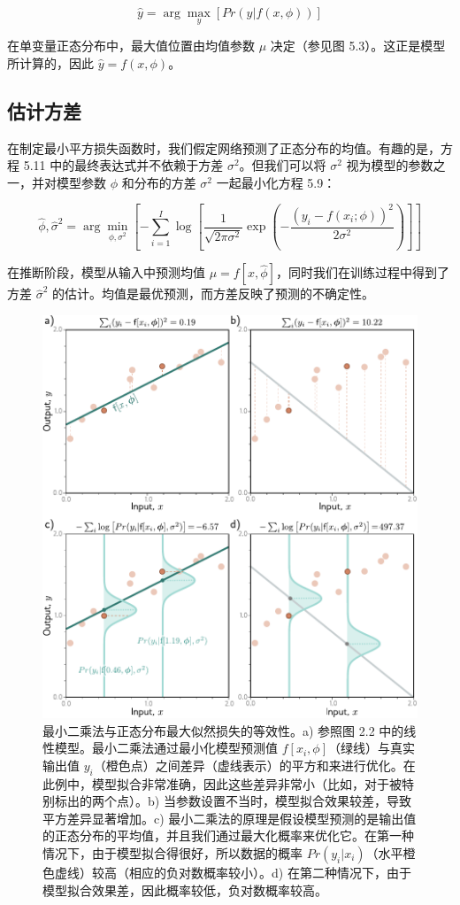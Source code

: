 \documentclass[lang=cn,newtx,10pt,scheme=chinese]{elegantbook}
\begin{document}
\begin{equation}
\hat{y} = \arg\max_y [Pr(y|f(x, \phi))] 
\end{equation}


在单变量正态分布中，最大值位置由均值参数 \(\mu\) 决定（参见图 5.3）。这正是模型所计算的，因此 \(\hat{y} = f(x, \phi)\)。
\subsection{估计方差}

在制定最小平方损失函数时，我们假定网络预测了正态分布的均值。有趣的是，方程 5.11 中的最终表达式并不依赖于方差 \(\sigma^2\)。但我们可以将 \(\sigma^2\) 视为模型的参数之一，并对模型参数 \(\phi\) 和分布的方差 \(\sigma^2\) 一起最小化方程 5.9：


\begin{equation}
\hat{\phi}, \hat{\sigma}^2 = \arg\min_{\phi,\sigma^2} \left[ -\sum_{i=1}^I \log \left[ \frac{1}{\sqrt{2\pi\sigma^2}} \exp \left( -\frac{(y_i - f(x_i; \phi))^2}{2\sigma^2} \right) \right] \right] 
\end{equation}


在推断阶段，模型从输入中预测均值 \(\mu = f[x, \hat{\phi}]\)，同时我们在训练过程中得到了方差 \(\hat{\sigma}^2\) 的估计。均值是最优预测，而方差反映了预测的不确定性。

\begin{figure}[ht!]
	\centering
	\includegraphics[width=0.7\linewidth]{PDFFigures/UDLChap5PDF/LossNormalRegression.pdf}
	\caption{最小二乘法与正态分布最大似然损失的等效性。a) 参照图 2.2 中的线性模型。最小二乘法通过最小化模型预测值 \(f[x_i,\phi]\)（绿线）与真实输出值 \(y_i\)（橙色点）之间差异（虚线表示）的平方和来进行优化。在此例中，模型拟合非常准确，因此这些差异非常小（比如，对于被特别标出的两个点）。b) 当参数设置不当时，模型拟合效果较差，导致平方差异显著增加。c) 最小二乘法的原理是假设模型预测的是输出值的正态分布的平均值，并且我们通过最大化概率来优化它。在第一种情况下，由于模型拟合得很好，所以数据的概率 \(Pr(y_i|x_i)\)（水平橙色虚线）较高（相应的负对数概率较小）。d) 在第二种情况下，由于模型拟合效果差，因此概率较低，负对数概率较高。}
\end{figure}
\end{document}

